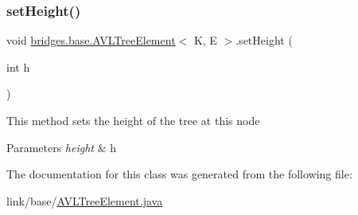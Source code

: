 \subsubsection{\texorpdfstring{set\+Height()}{setHeight()}}
{\footnotesize\ttfamily void \hyperlink{classbridges_1_1base_1_1_a_v_l_tree_element}{bridges.\+base.\+A\+V\+L\+Tree\+Element}$<$ K, E $>$.set\+Height (\begin{DoxyParamCaption}\item[{int}]{h }\end{DoxyParamCaption})}

This method sets the height of the tree at this node


\begin{DoxyParams}{Parameters}
{\em height} & h \\
\hline
\end{DoxyParams}


The documentation for this class was generated from the following file\+:\begin{DoxyCompactItemize}
\item 
link/base/\hyperlink{_a_v_l_tree_element_8java}{A\+V\+L\+Tree\+Element.\+java}\end{DoxyCompactItemize}
